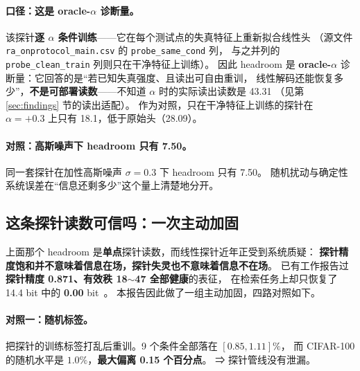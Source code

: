 \documentclass[11pt,a4paper]{ctexart}
\begin{document}
\paragraph{口径：这是 oracle-$\alpha$ 诊断量。}
该探针\textbf{逐 $\alpha$ 条件训练}——它在每个测试点的失真特征上重新拟合线性头
（源文件 \texttt{ra\_onprotocol\_main.csv} 的 \texttt{probe\_same\_cond} 列，
与之并列的 \texttt{probe\_clean\_train} 列则只在干净特征上训练）。
因此 headroom 是 \textbf{oracle-$\alpha$} 诊断量：它回答的是“若已知失真强度、且读出可自由重训，
线性解码还能恢复多少”，\textbf{不是可部署读数}——不知道 $\alpha$ 时的实际读出读数是 43.31
（见第 \ref{sec:findings} 节的读出适配）。
作为对照，只在干净特征上训练的探针在 $\alpha=+0.3$ 上只有 18.1，低于原始头（28.09）。

\paragraph{对照：高斯噪声下 headroom 只有 7.50。}
同一套探针在加性高斯噪声 $\sigma=0.3$ 下 headroom 只有 7.50。
随机扰动与确定性系统误差在“信息还剩多少”这个量上清楚地分开。

\subsection{这条探针读数可信吗：一次主动加固}

上面那个 headroom 是\textbf{单点}探针读数，而线性探针近年正受到系统质疑：
\textbf{探针精度饱和并不意味着信息在场，探针失灵也不意味着信息不在场}。
已有工作报告过\textbf{探针精度 0.871、有效秩 18$\sim$47 全部健康}的表征，
在检索任务上却只恢复了 14.4 bit 中的 \textbf{0.00} bit~\cite{gjepa}。
本报告因此做了一组主动加固，四路对照如下。

\paragraph{对照一：随机标签。}
把探针的训练标签打乱后重训。9 个条件全部落在 $[0.85,1.11]\%$，
而 CIFAR-100 的随机水平是 $1.0\%$，\textbf{最大偏离 0.15 个百分点}。
⇒ 探针管线没有泄漏。
\end{document}
